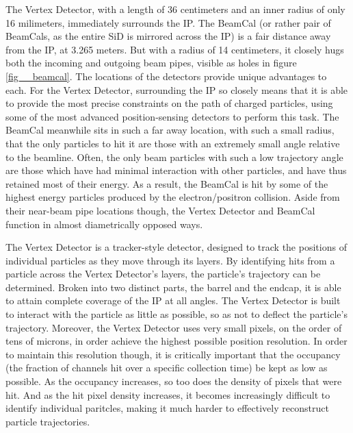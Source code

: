 \documentclass{report}
\begin{document}
                The Vertex Detector, with a length of 36 centimeters and an inner radius of only 16 milimeters, immediately surrounds the IP. The BeamCal (or rather pair of BeamCals, as the entire SiD is mirrored across the IP) is a fair distance away from the IP, at 3.265 meters. But with a radius of 14 centimeters, it closely hugs both the incoming and outgoing beam pipes, visible as holes in figure \ref{fig__beamcal}. The locations of the detectors provide unique advantages to each. For the Vertex Detector, surrounding the IP so closely means that it is able to provide the most precise constraints on the path of charged particles, using some of the most advanced position-sensing detectors to perform this task. The BeamCal meanwhile sits in such a far away location, with such a small radius, that the only particles to hit it are those with an extremely small angle relative to the beamline. Often, the only beam particles with such a low trajectory angle are those which have had minimal interaction with other particles, and have thus retained most of their energy. As a result, the BeamCal is hit by some of the highest energy particles produced by the electron/positron collision. Aside from their near-beam pipe locations though, the Vertex Detector and BeamCal function in almost diametrically opposed ways.

                The Vertex Detector is a tracker-style detector, designed to track the positions of individual particles as they move through its layers. By identifying hits from a particle across the Vertex Detector's layers, the particle's trajectory can be determined. Broken into two distinct parts, the barrel and the endcap, it is able to attain complete coverage of the IP at all angles. The Vertex Detector is built to interact with the particle as little as possible, so as not to deflect the particle's trajectory. Moreover, the Vertex Detector uses very small pixels, on the order of tens of microns, in order achieve the highest possible position resolution. In order to maintain this resolution though, it is critically important that the occupancy (the fraction of channels hit over a specific collection time) be kept as low as possible. As the occupancy increases, so too does the density of pixels that were hit. And as the hit pixel density increases, it becomes increasingly difficult to identify individual paritcles, making it much harder to effectively reconstruct particle trajectories.
                
\end{document}
